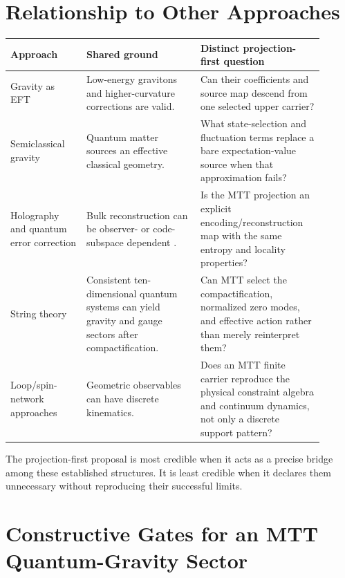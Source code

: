 \documentclass[11pt]{article}
\begin{document}
\section{Relationship to Other Approaches}

\begin{center}
\begin{tabular}{p{0.22\linewidth}p{0.33\linewidth}p{0.35\linewidth}}
\toprule
Approach & Shared ground & Distinct projection-first question \\
\midrule
Gravity as EFT &
Low-energy gravitons and higher-curvature corrections are valid. &
Can their coefficients and source map descend from one selected upper
carrier? \\
Semiclassical gravity &
Quantum matter sources an effective classical geometry. &
What state-selection and fluctuation terms replace a bare expectation-value
source when that approximation fails? \\
Holography and quantum error correction &
Bulk reconstruction can be observer- or code-subspace dependent
\cite{ADH}. &
Is the MTT projection an explicit encoding/reconstruction map with the same
entropy and locality properties? \\
String theory &
Consistent ten-dimensional quantum systems can yield gravity and gauge
sectors after compactification. &
Can MTT select the compactification, normalized zero modes, and effective
action rather than merely reinterpret them? \\
Loop/spin-network approaches &
Geometric observables can have discrete kinematics. &
Does an MTT finite carrier reproduce the physical constraint algebra and
continuum dynamics, not only a discrete support pattern? \\
\bottomrule
\end{tabular}
\end{center}

The projection-first proposal is most credible when it acts as a precise
bridge among these established structures.  It is least credible when it
declares them unnecessary without reproducing their successful limits.

\section{Constructive Gates for an MTT Quantum-Gravity Sector}
\end{document}
